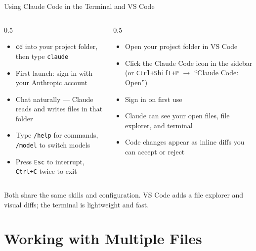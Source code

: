 \documentclass[aspectratio=169]{beamer}
\begin{document}
\begin{frame}{Using Claude Code in the Terminal and VS Code}
\begin{columns}[T]
\begin{column}{0.5\textwidth}
\begin{shadedbox}[title=\textbf{Terminal}]
\begin{itemize}\small
  \item \texttt{cd} into your project folder, then type \texttt{claude}
  \item First launch: sign in with your Anthropic account
  \item Chat naturally --- Claude reads and writes files in that folder
  \item Type \texttt{/help} for commands, \texttt{/model} to switch models
  \item Press \texttt{Esc} to interrupt, \texttt{Ctrl+C} twice to exit
\end{itemize}
\end{shadedbox}
\end{column}
\begin{column}{0.5\textwidth}
\begin{shadedbox}[title=\textbf{VS Code}]
\begin{itemize}\small
  \item Open your project folder in VS Code
  \item Click the Claude Code icon in the sidebar (or \texttt{Ctrl+Shift+P} $\rightarrow$ ``Claude Code: Open'')
  \item Sign in on first use
  \item Claude can see your open files, file explorer, and terminal
  \item Code changes appear as inline diffs you can accept or reject
\end{itemize}
\end{shadedbox}
\end{column}
\end{columns}
\vspace{0.3cm}
\alert{Both share the same skills and configuration.}  VS Code adds a file explorer and visual diffs; the terminal is lightweight and fast.
\end{frame}

\section{Working with Multiple Files}
\end{document}
